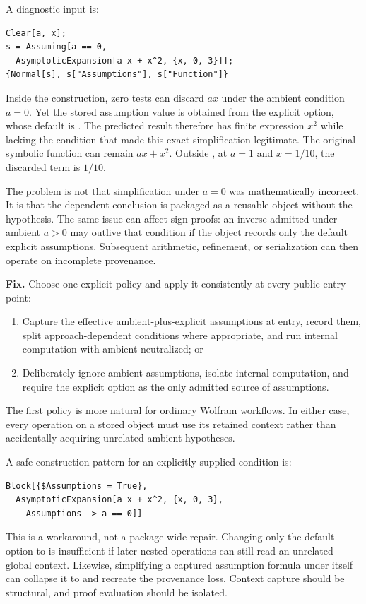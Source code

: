 A diagnostic input is:
\begin{lstlisting}
Clear[a, x];
s = Assuming[a == 0,
  AsymptoticExpansion[a x + x^2, {x, 0, 3}]];
{Normal[s], s["Assumptions"], s["Function"]}
\end{lstlisting}
Inside the construction, zero tests can discard $ax$ under the ambient condition $a=0$. Yet the stored assumption value is obtained from the explicit option, whose default is . The predicted result therefore has finite expression $x^2$ while lacking the condition that made this exact simplification legitimate. The original symbolic function can remain $ax+x^2$. Outside , at $a=1$ and $x=1/10$, the discarded term is $1/10$.

The problem is not that simplification under $a=0$ was mathematically incorrect. It is that the dependent conclusion is packaged as a reusable object without the hypothesis. The same issue can affect sign proofs: an inverse admitted under ambient $a>0$ may outlive that condition if the object records only the default explicit assumptions. Subsequent arithmetic, refinement, or serialization can then operate on incomplete provenance.

\textbf{Fix.} Choose one explicit policy and apply it consistently at every public entry point:
\begin{enumerate}
\item Capture the effective ambient-plus-explicit assumptions at entry, record them, split approach-dependent conditions where appropriate, and run internal computation with ambient  neutralized; or
\item Deliberately ignore ambient assumptions, isolate internal computation, and require the explicit option as the only admitted source of assumptions.
\end{enumerate}
The first policy is more natural for ordinary Wolfram workflows. In either case, every operation on a stored object must use its retained context rather than accidentally acquiring unrelated ambient hypotheses.

A safe construction pattern for an explicitly supplied condition is:
\begin{lstlisting}
Block[{$Assumptions = True},
  AsymptoticExpansion[a x + x^2, {x, 0, 3},
    Assumptions -> a == 0]]
\end{lstlisting}
This is a workaround, not a package-wide repair. Changing only the default option to  is insufficient if later nested operations can still read an unrelated global context. Likewise, simplifying a captured assumption formula under itself can collapse it to  and recreate the provenance loss. Context capture should be structural, and proof evaluation should be isolated.


